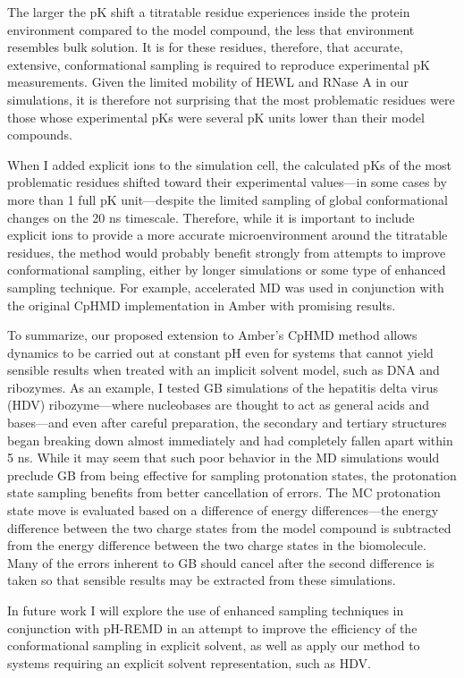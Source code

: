 The larger the pK shift a titratable residue experiences inside the
protein environment compared to the model compound, the less that environment
resembles bulk solution. It is for these residues, therefore, that accurate,
extensive, conformational sampling is required to reproduce experimental
pK measurements. Given the limited mobility of HEWL and RNase A in our
simulations, it is therefore not surprising that the most problematic residues
were those whose experimental pKs were several pK units lower than their
model compounds.

When I added explicit ions to the simulation cell, the calculated pKs of
the most problematic residues shifted toward their experimental values---in some
cases by more than 1 full pK unit---despite the limited sampling of
global conformational changes on the 20 ns timescale.  Therefore, while it is
important to include explicit ions to provide a more accurate microenvironment
around the titratable residues, the method would probably benefit strongly from
attempts to improve conformational sampling, either by longer simulations or
some type of enhanced sampling technique. For example, accelerated MD was used
in conjunction with the original CpHMD implementation in Amber with promising
results. \cite{Williams_JChemTheoryComput_2010_v6_p560}

To summarize, our proposed extension to Amber's CpHMD method allows dynamics to
be carried out at constant pH even for systems that cannot yield sensible
results when treated with an implicit solvent model, such as DNA and ribozymes.
As an example, I tested GB simulations of the hepatitis delta virus (HDV)
ribozyme---where nucleobases are thought to act as general acids and bases---and
even after careful preparation, the secondary and tertiary structures began
breaking down almost immediately and had completely fallen apart within 5 ns.
While it may seem that such poor behavior in the MD simulations would preclude
GB from being effective for sampling protonation states, the protonation state
sampling benefits from better cancellation of errors. The MC protonation state
move is evaluated based on a difference of energy differences---the energy
difference between the two charge states from the model compound is subtracted
from the energy difference between the two charge states in the biomolecule.
Many of the errors inherent to GB should cancel after the second difference is
taken so that sensible results may be extracted from these simulations.

In future work I will explore the use of enhanced sampling techniques in
conjunction with pH-REMD in an attempt to improve the efficiency of the
conformational sampling in explicit solvent, as well as apply our method to
systems requiring an explicit solvent representation, such as HDV.
